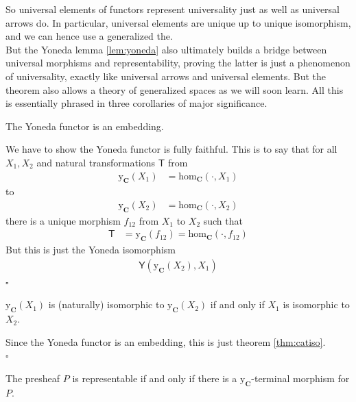 So universal elements of functors represent universality just as well as universal arrows do.
In particular, universal elements are unique up to unique isomorphism, and we can hence use a generalized {\glqq}the{\grqq}.
\\
But the Yoneda lemma \ref{lem:yoneda} also ultimately builds a bridge between universal morphisms and representability, proving the latter is just a phenomenon of universality, exactly like universal arrows and universal elements.
But the theorem also allows a theory of {\glqq}generalized spaces{\grqq} as we will soon learn.
All this is essentially phrased in three corollaries of major significance.
\\
\begin{cor}
\label{cor:yoneda1}
The Yoneda functor is an embedding.
\end{cor}
\begin{prf}
We have to show the Yoneda functor is fully faithful.
This is to say that for all $X_{1},X_{2}$ and natural transformations $\mathsf{T}$ from
\begin{align*}
  \mathrm{y}_{\mathbf{C}}(X_{1})
  &=
  \mathrm{hom}_{\mathbf{C}}(\cdot,X_{1})
\end{align*}
to
\begin{align*}
  \mathrm{y}_{\mathbf{C}}(X_{2})
  &=
  \mathrm{hom}_{\mathbf{C}}(\cdot,X_{2})
\end{align*}
there is a unique morphism $f_{12}$ from $X_{1}$ to $X_{2}$ such that
\begin{align*}
  \mathsf{T}
  &=
  \mathrm{y}_{\mathbf{C}}(f_{12})
  =
  \mathrm{hom}_{\mathbf{C}}(\cdot,f_{12})
\end{align*}
But this is just the Yoneda isomorphism
\begin{align*}
  \mathsf{Y}(\mathrm{y}_{\mathbf{C}}(X_{2}),X_{1})
\end{align*}
\phantom{proven}
\hfill
$\square$
\end{prf}
\begin{cor}
\label{cor:yoneda2}
$\mathrm{y}_{\mathbf{C}}(X_{1})$ is (naturally) isomorphic to $\mathrm{y}_{\mathbf{C}}(X_{2})$ if and only if $X_{1}$ is isomorphic to $X_{2}$.
\end{cor}
\begin{prf}
Since the Yoneda functor is an embedding, this is just theorem \ref{thm:catiso}.
\\
\phantom{proven}
\hfill
$\square$
\end{prf}
\begin{cor}
\label{cor:yoneda3}
The presheaf $P$ is representable if and only if there is a $\mathrm{y}_{\mathbf{C}}$-terminal morphism for $P$.
\end{cor}
